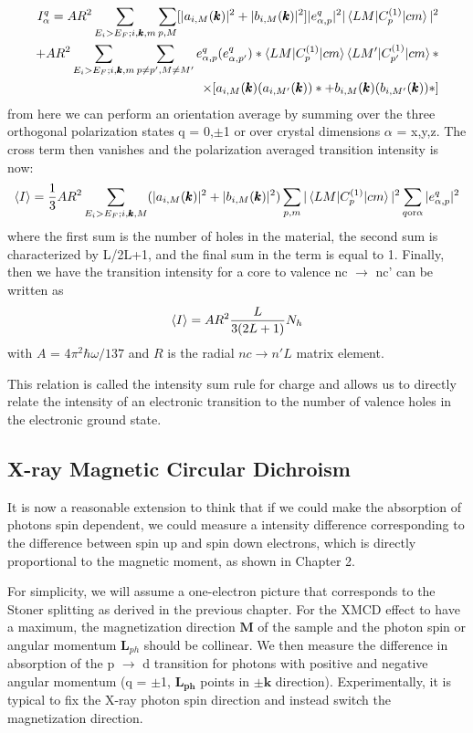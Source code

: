 \begin{align}
I_{\alpha}^q=AR^2\sum_{E_i>E_F; i ,\pmb{k}, m}\sum_{p,M}[|a_{i,M}(\pmb{k})|^2+|b_{i,M}(\pmb{k})|^2]|e_{\alpha,p}^q|^2|\braket{LM|C_p^{(1)}|cm}|^2 \\
+ AR^2\sum_{E_i>E_F; i,\pmb{k},m}\sum_{p \neq p', M \neq M'}e^q_{\alpha,p}(e^q_{\alpha,p'})*\braket{LM|C_p^{(1)}|cm}\braket{LM'|C_{p'}^{(1)}|cm}* \\
\times [a_{i,M}(\pmb{k})(a_{i,M'}(\pmb{k}))*+b_{i,M}(\pmb{k})(b_{i,M'}(\pmb{k}))*]
\end{align}
from here we can perform an orientation average by summing over the three orthogonal polarization states q = 0,$\pm$1 or over crystal dimensions $\alpha$ = x,y,z. The cross term then vanishes and the polarization averaged transition intensity is now:
\begin{eqnarray}
\braket{I}=\frac{1}{3}AR^2\sum_{E_i>E_F; i,\pmb{k},M}(|a_{i,M}(\pmb{k})|^2+|b_{i,M}(\pmb{k})|^2)\sum_{p,m}|\braket{LM|C_p^{(1)}|cm}|^2\sum_{q \text{or} \alpha}|e_{\alpha,p}^q|^2
\end{eqnarray}
where the first sum is the number of holes in the material, the second sum is characterized by L/2L+1, and the final sum in the term is equal to 1. Finally, then we have the transition intensity for a core to valence nc $\rightarrow$ nc' can be written as
\begin{equation}
\braket{I} = AR^2\frac{L}{3(2L+1)}N_h
\end{equation}
with $A$ = 4$\pi^2\hbar\omega/137$ and $R$ is the radial $nc\rightarrow n'L$ matrix element.

This relation is called the intensity sum rule for charge and allows us to directly relate the intensity of an electronic transition to the number of valence holes in the electronic ground state.

\subsection{X-ray Magnetic Circular Dichroism}

It is now a reasonable extension to think that if we could make the absorption of photons spin dependent, we could measure a intensity difference corresponding to the difference between spin up and spin down electrons, which is directly proportional to the magnetic moment, as shown in Chapter 2.

For simplicity, we will assume a one-electron picture that corresponds to the Stoner splitting as derived in the previous chapter. For the XMCD effect to have a maximum, the magnetization direction $\pmb{M}$ of the sample and the photon spin or angular momentum $\pmb{L}_{ph}$ should be collinear. We then measure the difference in absorption of the p $\rightarrow$ d transition for photons with positive and negative angular momentum (q = $\pm$1, $\pmb{L_{ph}}$ points in $\pm\pmb{k}$ direction). Experimentally, it is typical to fix the X-ray photon spin direction and instead switch the magnetization direction.

